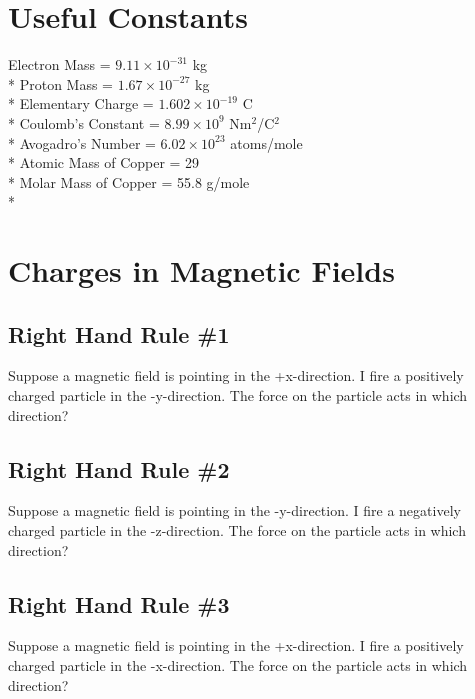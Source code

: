 \documentclass[12pt]{article}
\begin{document}
\maketitle
\tableofcontents
\hspace{30mm}

\section*{Useful Constants}
Electron Mass = $9.11 \times 10^{-31}$ kg \\*
Proton Mass = $1.67 \times 10^{-27}$ kg \\*
Elementary Charge = $1.602 \times 10^{-19}$ C \\*
Coulomb's Constant = $8.99 \times 10^9$ Nm$^2$/C$^2$ \\*
Avogadro's Number = $ 6.02 \times 10^{23}$ atoms/mole \\*
Atomic Mass of Copper = 29 \\*
Molar Mass of Copper = 55.8 g/mole \\*

\pagebreak

\section{Charges in Magnetic Fields}

\subsection{Right Hand Rule \#1}
Suppose a magnetic field is pointing in the +x-direction.  I fire a positively charged particle in the -y-direction.  The force on the particle acts in which direction?

\subsection{Right Hand Rule \#2}
Suppose a magnetic field is pointing in the -y-direction.  I fire a negatively charged particle in the -z-direction.  The force on the particle acts in which direction?

\subsection{Right Hand Rule \#3}
Suppose a magnetic field is pointing in the +x-direction.  I fire a positively charged particle in the -x-direction.  The force on the particle acts in which direction?
\end{document}
